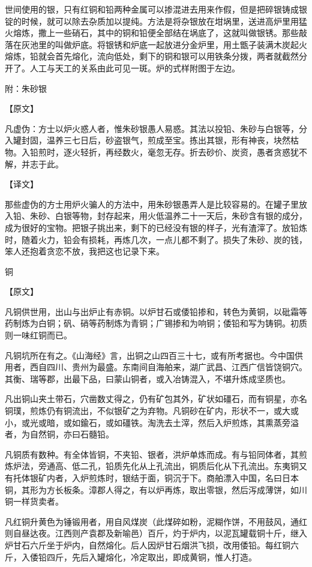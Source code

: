 \documentclass[12pt,UTF8]{ctexbook}
\begin{document}
世间使用的银，只有红铜和铅两种金属可以掺混进去用来作假，但是把碎银铸成银锭的时候，就可以除去杂质加以提纯。方法是将杂银放在坩埚里，送进高炉里用猛火熔炼，撒上一些硝石，其中的铜和铅便全部结在埚底了，这就叫做银锈。那些敲落在灰池里的叫做炉底。将银锈和炉底一起放进分金炉里，用土甑子装满木炭起火熔炼，铅就会首先熔化，流向低处，剩下的铜和银可以用铁条分拨，两者就截然分开了。人工与天工的关系由此可见一斑。炉的式样附图于左边。

附：朱砂银

【原文】

凡虚伪：方士以炉火惑人者，惟朱砂银愚人易惑。其法以投铅、朱砂与白银等，分入罐封固，温养三七日后，砂盗银气，煎成至宝。拣出其银，形有神丧，块然枯物。入铅煎时，逐火轻折，再经数火，毫忽无存。折去砂价、炭资，愚者贪惑犹不解，并志于此。

【译文】

那些虚伪的方士用炉火骗人的方法中，用朱砂银愚弄人是比较容易的。在罐子里放入铅、朱砂、白银等物，封存起来，用火低温养二十一天后，朱砂含有银的成分，成为很好的宝物。把银子挑出来，剩下的已经没有银的样子，光有渣滓了。放铅炼时，随着火力，铅会有损耗，再炼几次，一点儿都不剩了。损失了朱砂、炭的钱，笨人还抱着贪恋不放，我把这也记录下来。

铜

【原文】

凡铜供世用，出山与出炉止有赤铜。以炉甘石或倭铅掺和，转色为黄铜，以砒霜等药制炼为白铜；矾、硝等药制炼为青铜；广锡掺和为响铜；倭铅和写为铸铜。初质则一味红铜而已。

凡铜坑所在有之。《山海经》言，出铜之山四百三十七，或有所考据也。今中国供用者，西自四川、贵州为最盛。东南间自海舶来，湖广武昌、江西广信皆饶铜穴。其衡、瑞等郡，出最下品，曰蒙山铜者，或入冶铸混入，不堪升炼成坚质也。

凡出铜山夹土带石，穴凿数丈得之，仍有矿包其外，矿状如礓石，而有铜星，亦名铜璞，煎炼仍有铜流出，不似银矿之为弃物。凡铜砂在矿内，形状不一，或大或小，或光或暗，或如鍮石，或如礓铁。淘洗去土滓，然后入炉煎炼，其熏蒸旁溢者，为自然铜，亦曰石髓铅。

凡铜质有数种。有全体皆铜，不夹铅、银者，洪炉单炼而成。有与铅同体者，其煎炼炉法，旁通高、低二孔，铅质先化从上孔流出，铜质后化从下孔流出。东夷铜又有托体银矿内者，入炉煎炼时，银结于面，铜沉于下。商舶漂入中国，名曰日本铜，其形为方长板条。漳郡人得之，有以炉再炼，取出零银，然后泻成薄饼，如川铜一样货卖者。

凡红铜升黄色为锤锻用者，用自风煤炭（此煤碎如粉，泥糊作饼，不用鼓风，通红则自昼达夜。江西则产袁郡及新喻邑）百斤，灼于炉内，以泥瓦罐载铜十斤，继入炉甘石六斤坐于炉内，自然熔化。后人因炉甘石烟洪飞损，改用倭铅。每红铜六斤，入倭铅四斤，先后入罐熔化，冷定取出，即成黄铜，惟人打造。
\end{document}
